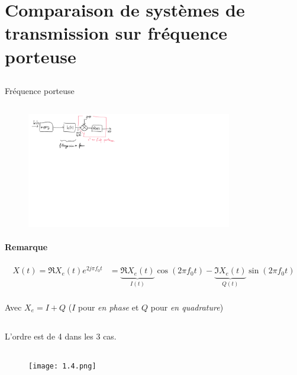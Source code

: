 \documentclass{article}
\begin{document}
\section{Comparaison de systèmes de transmission sur fréquence porteuse}

\subsection{}
Fréquence porteuse

\subsection{}


\begin{figure}[H]
    \centering
    \includegraphics[width=0.8\textwidth]{1.2.png}
    \caption{}
    \label{fig:}
\end{figure}

\paragraph{Remarque}

\begin{align*}
    X(t) = \Re X_e(t) e^{2j \pi f_0 t}
    &= \underbrace{\Re X_e(t)}_{I(t)} \cos(2 \pi f_0 t) - \underbrace{\Im X_e(t)}_{Q(t)} \sin(2 \pi f_0 t) \\
\end{align*}

Avec $X_e = I + Q$ ($I$ pour \emph{en phase } et $Q$ pour \emph{en quadrature})

\subsection{}
L'ordre est de 4 dans les 3 cas.

\subsection{}
\begin{figure}[H]
    \centering
    \texttt{[image: 1.4.png]}
    \caption{}
    \label{fig:}
\end{figure}
\end{document}
